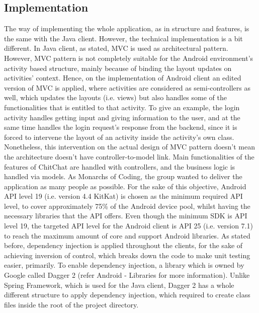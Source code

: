 \documentclass[11pt,a4paper]{report}
\begin{document}
\subsection{Implementation}
The way of implementing the whole application, as in structure and features, is the same with the Java client. However, the technical implementation is a bit different. In Java client, as stated, MVC is used as architectural pattern. However, MVC pattern is not completely suitable for the Android environment’s activity based structure, mainly because of binding the layout updates on activities’ context. Hence, on the implementation of Android client an edited version of MVC is applied, where activities are considered as semi-controllers as well, which updates the layouts (i.e. views) but also handles some of the functionalities that is entitled to that activity. To give an example, the login activity handles getting input and giving information to the user, and at the same time handles the login request’s response from the backend, since it is forced to intervene the layout of an activity inside the activity’s own class. Nonetheless, this intervention on the actual design of MVC pattern doesn’t mean the architecture doesn’t have controller-to-model link. Main functionalities of the features of ChitChat are handled with controllers, and the business logic is handled via models.
As Monarchs of Coding, the group wanted to deliver the application as many people as possible. For the sake of this objective, Android API level 19 (i.e. version 4.4 KitKat) is chosen as the minimum required API level, to cover approximately 75\% of the Android device pool, whilst having the necessary libraries that the API offers. Even though the minimum SDK is API level 19, the targeted API level for the Android client is API 25 (i.e. version 7.1) to reach the maximum amount of core and support Android libraries.
As stated before, dependency injection is applied throughout the clients, for the sake of achieving inversion of control, which breaks down the code to make unit testing easier, primarily. To enable dependency injection, a library which is owned by Google called Dagger 2 (refer Android - Libraries for more information). Unlike Spring Framework, which is used for the Java client, Dagger 2 has a whole different structure to apply dependency injection, which required to create class files inside the root of the project directory.
\end{document}
